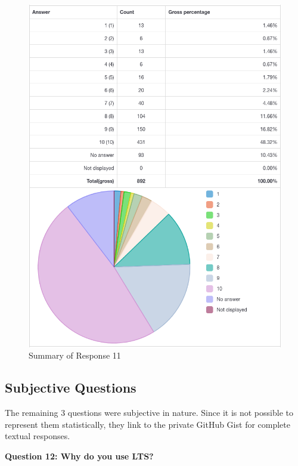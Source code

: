 \documentclass{article}
\begin{document}
\vspace{3mm}
\begin{figure}[h!]
\centering
\includegraphics[width=15.5cm]{assets/11-complete-responses.png}
\caption{Summary of Response 11}
\end{figure}

\newpage

\subsection{Subjective Questions}

\vspace{3mm}
\large
The remaining 3 questions were subjective in nature. Since it is not possible to represent them
statistically, they link to the private GitHub Gist for complete textual responses.

\vspace{15mm}
\large{\textbf{Question 12: Why do you use LTS?}}
\end{document}
